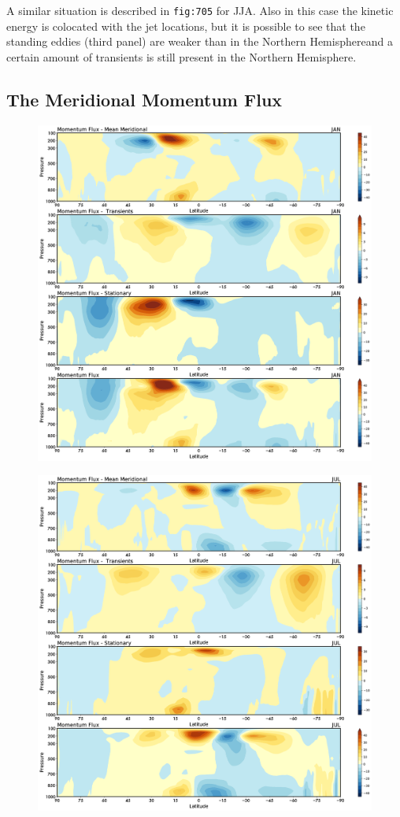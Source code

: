 A similar situation is described in \texttt{fig:705} for JJA. Also in
this case the kinetic energy is colocated with the jet locations, but it
is possible to see that the standing eddies (third panel) are weaker
than in the Northern Hemisphereand a certain amount of transients is
still present in the Northern Hemisphere.

\subsection{The Meridional Momentum
Flux}\label{the-meridional-momentum-flux}

\begin{figure}
\centering
\includegraphics[width = .7 \textwidth]{figs/GD/JANUVFlux.png}
\caption{}\label{}
\end{figure}

\begin{figure}
\centering
\includegraphics[width = .7 \textwidth]{figs/GD/JULUVFlux.png}
\caption{}\label{}
\end{figure}

